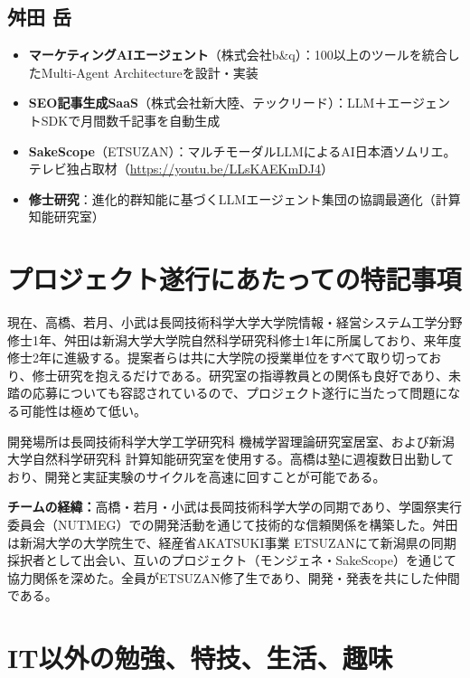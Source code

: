 \documentclass[paper=a4,fontsize=10.5bp,jafontsize=10.5bp,twocolumn]{jlreq}
\begin{document}
\subsection*{舛田 岳}

\begin{itemize}
  \item \textbf{マーケティングAIエージェント}（株式会社b\&q）：100以上のツールを統合したMulti-Agent Architectureを設計・実装
  \item \textbf{SEO記事生成SaaS}（株式会社新大陸、テックリード）：LLM＋エージェントSDKで月間数千記事を自動生成
  \item \textbf{SakeScope}（ETSUZAN）：マルチモーダルLLMによるAI日本酒ソムリエ。テレビ独占取材（\url{https://youtu.be/LLsKAEKmDJ4}）
  \item \textbf{修士研究}：進化的群知能に基づくLLMエージェント集団の協調最適化（計算知能研究室）
\end{itemize}

\section{プロジェクト遂行にあたっての特記事項}

現在、高橋、若月、小武は長岡技術科学大学大学院情報・経営システム工学分野修士1年、舛田は新潟大学大学院自然科学研究科修士1年に所属しており、来年度修士2年に進級する。提案者らは共に大学院の授業単位をすべて取り切っており、修士研究を抱えるだけである。研究室の指導教員との関係も良好であり、未踏の応募についても容認されているので、プロジェクト遂行に当たって問題になる可能性は極めて低い。

開発場所は長岡技術科学大学工学研究科 機械学習理論研究室居室、および新潟大学自然科学研究科 計算知能研究室を使用する。高橋は塾に週複数日出勤しており、開発と実証実験のサイクルを高速に回すことが可能である。

\noindent\textbf{チームの経緯：}高橋・若月・小武は長岡技術科学大学の同期であり、学園祭実行委員会（NUTMEG）での開発活動を通じて技術的な信頼関係を構築した。舛田は新潟大学の大学院生で、経産省AKATSUKI事業 ETSUZANにて新潟県の同期採択者として出会い、互いのプロジェクト（モンジェネ・SakeScope）を通じて協力関係を深めた。全員がETSUZAN修了生であり、開発・発表を共にした仲間である。

\section{IT以外の勉強、特技、生活、趣味}
\end{document}
